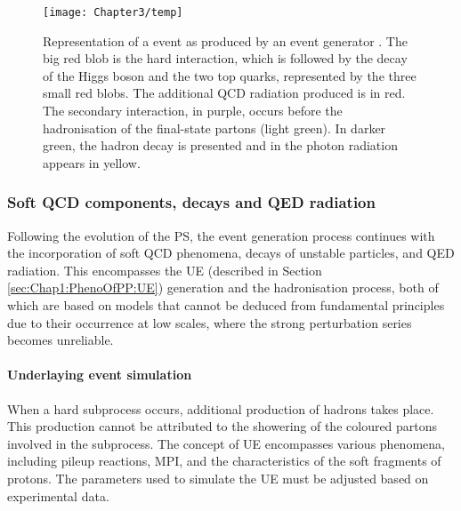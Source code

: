  \begin{figure}
    \centering
    \texttt{[image: Chapter3/temp]}
    \caption{Representation of a \ttH event as produced by an event generator \cite{Gleisberg:2008ta}. The big red blob is the hard interaction, which is followed by the decay of the Higgs boson and the two top quarks, represented by the three small red blobs. The additional QCD radiation produced is in red. The secondary interaction, in purple, occurs before the hadronisation of the final-state partons (light green). In darker green, the hadron decay is presented and in the photon radiation appears in yellow. }
    \label{fig:Chap3:ttHSimulated}
\end{figure}


\subsubsection{Soft QCD components, decays and QED radiation}
Following the evolution of the PS, the event generation process continues with the 
incorporation of soft QCD phenomena, decays of unstable particles, and QED 
radiation. This encompasses the UE (described in Section \ref{sec:Chap1:PhenoOfPP:UE}) 
generation and the hadronisation process, both of which are based on models that 
cannot be deduced from fundamental principles due to their occurrence at low scales, 
where the strong perturbation series becomes unreliable. 



\paragraph{Underlaying event simulation}\mbox{}

When a hard subprocess occurs, additional production of hadrons takes place. 
This production cannot be attributed to the showering of the coloured partons involved in the subprocess. 
The concept of UE encompasses various phenomena, 
including pileup reactions, MPI, and the characteristics of the soft fragments of protons.
The parameters used to simulate the UE must be adjusted based on experimental data.


